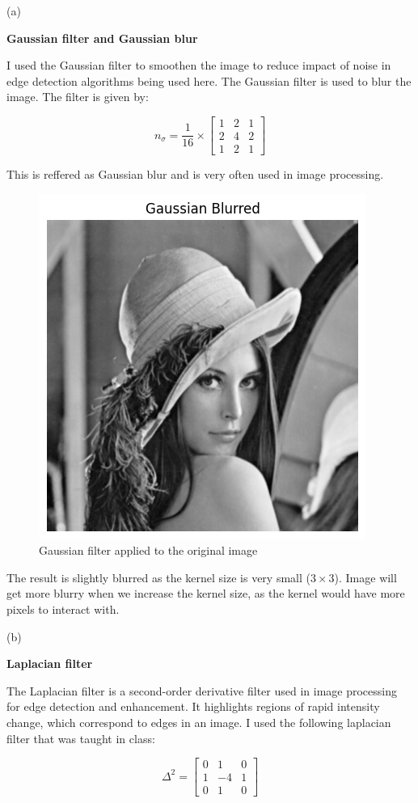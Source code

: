 {\large(a)}

\textbf{Gaussian filter and Gaussian blur}

I used the Gaussian filter to smoothen the image to reduce impact of noise in edge detection algorithms being used here. The Gaussian filter is used to blur the image. The filter is given by:

$$n_\sigma = \frac{1}{16} \times
\begin{bmatrix}
    1 & 2 & 1 \\
    2 & 4 & 2 \\
    1 & 2 & 1
\end{bmatrix}$$

This is reffered as Gaussian blur and is very often used in image processing.

\begin{figure}[H]
    \centering
    \includegraphics[width=.5\textwidth]{res/3a_gaussian.png}
    \caption{Gaussian filter applied to the original image}\label{fig:3a_gaussian}
    \label{fig:3d_gaussian}
\end{figure}

The result is slightly blurred as the kernel size is very small ($3\times3$). Image will get more blurry when we increase the kernel size, as the kernel would have more pixels to interact with.

{\large(b)}

\textbf{Laplacian filter}

The Laplacian filter is a second-order derivative filter used in image processing for edge detection and enhancement. It highlights regions of rapid intensity change, which correspond to edges in an image. I used the following laplacian filter that was taught in class:

$$\Delta^2 =
\begin{bmatrix}
    0 & 1 & 0 \\
    1 & -4 & 1 \\
    0 & 1 & 0
\end{bmatrix}$$

